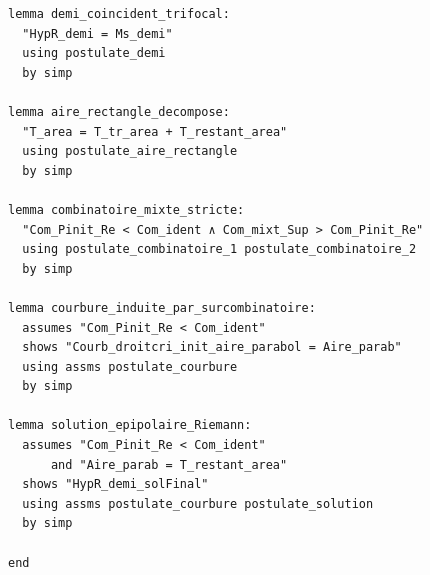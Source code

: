 \documentclass[a4paper,11pt]{article}
\begin{document}
\begin{holcode}[title={\textcolor{white}{File: methode\_spectral.thy -- Part 1/4}}]
\begin{lstlisting}
lemma demi_coincident_trifocal:
  "HypR_demi = Ms_demi"
  using postulate_demi
  by simp

lemma aire_rectangle_decompose:
  "T_area = T_tr_area + T_restant_area"
  using postulate_aire_rectangle
  by simp

lemma combinatoire_mixte_stricte:
  "Com_Pinit_Re < Com_ident ∧ Com_mixt_Sup > Com_Pinit_Re"
  using postulate_combinatoire_1 postulate_combinatoire_2
  by simp

lemma courbure_induite_par_surcombinatoire:
  assumes "Com_Pinit_Re < Com_ident"
  shows "Courb_droitcri_init_aire_parabol = Aire_parab"
  using assms postulate_courbure
  by simp

lemma solution_epipolaire_Riemann:
  assumes "Com_Pinit_Re < Com_ident"
      and "Aire_parab = T_restant_area"
  shows "HypR_demi_solFinal"
  using assms postulate_courbure postulate_solution
  by simp

end
\end{lstlisting}
\end{holcode}

\end{document}
